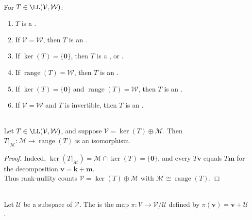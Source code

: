 \begin{definition} \label{def:linear-map-morphism-terminology-vector-spaces} \\
For $T\in\LL(\mathcal{V},\mathcal{W})$:
\begin{enumerate}[label=(\roman*)]
\setlength{\itemsep}{0pt}
\item $T$ is a .
\item If $\mathcal{V}=\mathcal{W}$, then $T$ is an .
\item If $\ker(T)=\{\mathbf{0}\}$, then $T$ is a , or .
\item If $\operatorname{range}(T)=\mathcal{W}$, then $T$ is an .
\item If $\ker(T)=\{\mathbf{0}\}$ and $\operatorname{range}(T)=\mathcal{W}$, then $T$ is an .
\item If $\mathcal{V}=\mathcal{W}$ and $T$ is invertible, then $T$ is an .
\end{enumerate}
\end{definition}

\begin{proposition} \label{prop:rank-nullity-complement-view} \\
Let $T\in\LL(\mathcal{V},\mathcal{W})$, and suppose $\mathcal{V}=\ker(T)\oplus\mathcal{M}$. Then $T|_{\mathcal{M}}:\mathcal{M}\to\operatorname{range}(T)$ is an isomorphism.
\begin{proof}
Indeed, $\ker(T|_{\mathcal{M}})=\mathcal{M}\cap\ker(T)=\{\mathbf{0}\}$, and every $T\mathbf{v}$ equals $T\mathbf{m}$ for the decomposition $\mathbf{v}=\mathbf{k}+\mathbf{m}$.\\
Thus rank-nullity counts $\mathcal{V}=\ker(T)\oplus\mathcal{M}$ with $\mathcal{M}\cong\operatorname{range}(T)$.
\end{proof}
\end{proposition}

\begin{definition} \\
Let $\mathcal{U}$ be a subspace of $\mathcal{V}$. The  is the map $\pi : \mathcal{V} \to \mathcal{V}/\mathcal{U}$ defined by $\pi(\mathbf{v})=\mathbf{v}+\mathcal{U}$.
\end{definition}

